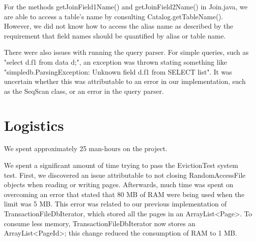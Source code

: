 \documentclass[paper=a4, fontsize=11pt]{scrartcl} %
\numberwithin{equation}{section} %
\numberwithin{figure}{section} %
\numberwithin{table}{section} %
\begin{document}
For the methods getJoinField1Name() and getJoinField2Name() in Join.java, we are able to access a table's name by consulting Catalog.getTableName(). However, we did not know how to access the alias name as described by the requirement that field names should be quantified by alias or table name.

There were also issues with running the query parser. For simple queries, such as "select d.f1 from data d;", an exception was thrown stating something like "simpledb.ParsingException: Unknown field d.f1 from SELECT list". It was uncertain whether this was attributable to an error in our implementation, such as the SeqScan class, or an error in the query parser.




\section{Logistics}

We spent approximately 25 man-hours on the project.

We spent a significant amount of time trying to pass the EvictionTest system test. First, we discovered an issue attributable to not closing RandomAccessFile objects when reading or writing pages. Afterwards, much time was spent on overcoming an error that stated that 80 MB of RAM were being used when the limit was 5 MB. This error was related to our previous implementation of TransactionFileDbIterator, which stored all the pages in an ArrayList<Page>. To consume less memory, TransactionFileDbIterator now stores an ArrayList<PageId>; this change reduced the consumption of RAM to 1 MB.
\end{document}
